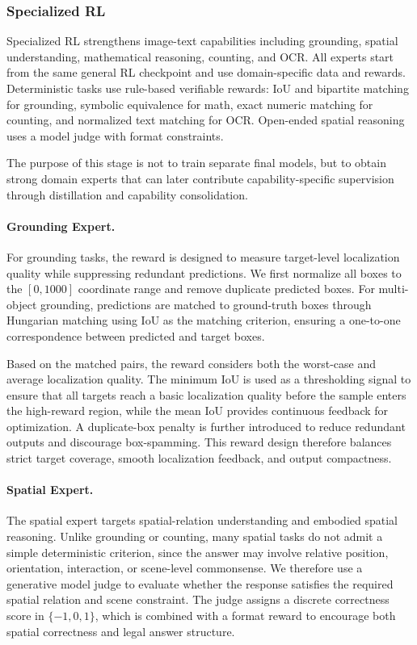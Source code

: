 \documentclass{llmxive}
\begin{document}
\subsubsection{Specialized RL}

Specialized RL strengthens image-text capabilities including grounding, spatial understanding, mathematical reasoning, counting, and OCR. All experts start from the same general RL checkpoint and use domain-specific data and rewards. Deterministic tasks use rule-based verifiable rewards: IoU and bipartite matching for grounding, symbolic equivalence for math, exact numeric matching for counting, and normalized text matching for OCR. Open-ended spatial reasoning uses a model judge with format constraints.

The purpose of this stage is not to train separate final models, but to obtain strong domain experts that can later contribute capability-specific supervision through distillation and capability consolidation.

\paragraph{Grounding Expert.}
For grounding tasks, the reward is designed to measure target-level localization quality while suppressing redundant predictions. We first normalize all boxes to the $[0,1000]$ coordinate range and remove duplicate predicted boxes. For multi-object grounding, predictions are matched to ground-truth boxes through Hungarian matching using IoU as the matching criterion, ensuring a one-to-one correspondence between predicted and target boxes.

Based on the matched pairs, the reward considers both the worst-case and average localization quality. The minimum IoU is used as a thresholding signal to ensure that all targets reach a basic localization quality before the sample enters the high-reward region, while the mean IoU provides continuous feedback for optimization. A duplicate-box penalty is further introduced to reduce redundant outputs and discourage box-spamming. This reward design therefore balances strict target coverage, smooth localization feedback, and output compactness.

\paragraph{Spatial Expert.}
The spatial expert targets spatial-relation understanding and embodied spatial reasoning. Unlike grounding or counting, many spatial tasks do not admit a simple deterministic criterion, since the answer may involve relative position, orientation, interaction, or scene-level commonsense. We therefore use a generative model judge to evaluate whether the response satisfies the required spatial relation and scene constraint. The judge assigns a discrete correctness score in $\{-1,0,1\}$, which is combined with a format reward to encourage both spatial correctness and legal answer structure.
\end{document}
